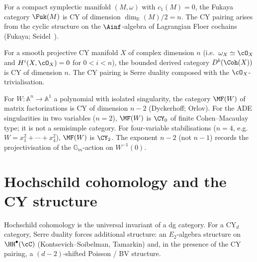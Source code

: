 \begin{example}
\label{ex:fukaya-cy}
For a compact symplectic manifold $(M, \omega)$ with $c_1(M) = 0$, the Fukaya category $\Fuk(M)$ is CY of dimension $\dim_{\mathbb{R}}(M)/2 = n$. The CY pairing arises from the cyclic structure on the $\Ainf$-algebra of Lagrangian Floer cochains (Fukaya; Seidel~\cite{Seidel2008}).
\end{example}

\begin{example}
\label{ex:derived-cy}
For a smooth projective CY manifold $X$ of complex dimension $n$ (i.e.\ $\omega_X \simeq \cO_X$ and $H^i(X, \cO_X) = 0$ for $0 < i < n$), the bounded derived category $D^b(\Coh(X))$ is CY of dimension $n$. The CY pairing is Serre duality composed with the $\cO_X$-trivialisation.
\end{example}

\begin{example}
\label{ex:mf-cy}
For $W \colon \mathbb{A}^n \to \mathbb{A}^1$ a polynomial with isolated singularity, the category $\MF(W)$ of matrix factorizations is CY of dimension $n - 2$ (Dyckerhoff; Orlov). For the ADE singularities in two variables ($n = 2$), $\MF(W)$ is $\CY_0$ of finite Cohen--Macaulay type; it is not a semisimple category. For four-variable stabilisations ($n = 4$, e.g.\ $W = x_1^2 + \cdots + x_4^2$), $\MF(W)$ is $\CY_2$. The exponent $n - 2$ (not $n - 1$) records the projectivisation of the $\mathbb{G}_m$-action on $W^{-1}(0)$.
\end{example}

\section{Hochschild cohomology and the CY structure}
\label{sec:cy-hochschild}

Hochschild cohomology is the universal invariant of a dg category. For a CY$_d$ category, Serre duality forces additional structure: an $E_2$-algebra structure on $\HH^\bullet(\cC)$ (Kontsevich--Soibelman, Tamarkin) and, in the presence of the CY pairing, a $(d-2)$-shifted Poisson / BV structure.


